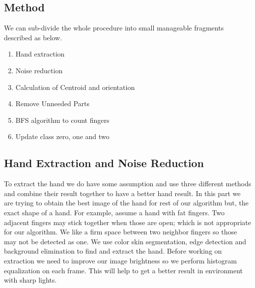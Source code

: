 \documentclass{report}
\begin{document}
\subsection{Method}
We can sub-divide the whole procedure into small manageable fragments described as below.
\begin{enumerate}

\item{Hand extraction}
\item{Noise reduction}
\item{Calculation of Centroid and orientation}
\item{Remove Unneeded Parts}
\item{BFS algorithm to count fingers}
\item{Update class zero, one and two}
\end{enumerate}
\subsection{Hand Extraction and Noise Reduction}
To extract the hand we do have some assumption and use three different methods and combine their result together to have a better hand result. In this part we are trying to obtain the best image of the hand for rest of our algorithm but, the exact shape of a hand. For example, assume a hand with fat fingers. Two adjacent fingers may stick together when those are open; which is not appropriate for our algorithm. We like a firm space between two neighbor fingers so those may not be detected as one. We use color skin segmentation, edge detection and background elimination to find and extract the hand. Before working on extraction we need to improve our image brightness so we perform histogram equalization on each frame. This will help to get a better result in environment with sharp lights. 
\end{document}
